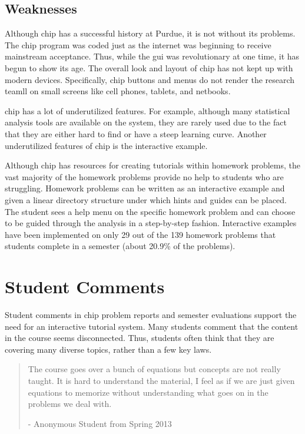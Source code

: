 \subsection*{Weaknesses}

Although \gls{chip} has a successful history at Purdue, it is not without its problems. The \gls{chip} program was coded just as the internet was beginning to receive mainstream acceptance. Thus, while the \gls{gui} was revolutionary at one time, it has begun to show its age. The overall look and layout of \gls{chip} has not kept up with modern devices. Specifically, \gls{chip} buttons and menus do not render the research teamll on small screens like cell phones, tablets, and netbooks.

\gls{chip} has a lot of underutilized features. For example, although many statistical analysis tools are available on the system, they are rarely used due to the fact that they are either hard to find or have a steep learning curve. Another underutilized features of \gls{chip} is the interactive example.

Although \gls{chip} has resources for creating tutorials within homework problems, the vast majority of the homework problems provide no help to students who are struggling. Homework problems can be written as an interactive example and given a linear directory structure under which hints and guides can be placed. The student sees a help menu on the specific homework problem and can choose to be guided through the analysis in a step-by-step fashion. Interactive examples have been implemented on only 29 out of the 139 homework problems that students complete in a semester (about 20.9\% of the problems).

\section{Student Comments}

Student comments in \gls{chip} problem reports and semester evaluations support the need for an interactive tutorial system. Many students comment that the content in the course seems disconnected. Thus, students often think that they are covering many diverse topics, rather than a few key laws.

\begin{quote}
The course goes over a bunch of equations but concepts are not really taught. It is hard to understand the material, I feel as if we are just given equations to memorize without understanding what goes on in the problems we deal with.

- Anonymous Student from Spring 2013
\end{quote}

